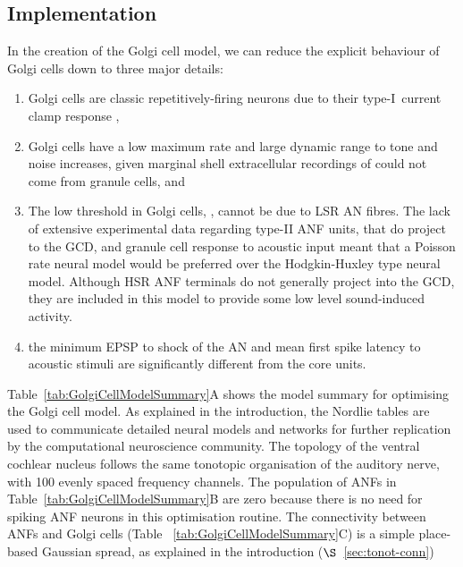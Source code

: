 \subsection{Implementation}\label{sec:Golgi:implementation}

In the creation of the Golgi cell model, we can reduce the explicit behaviour of Golgi cells down to three major details:
 \begin{enumerate}
 \item Golgi cells are classic repetitively-firing neurons due to
   their type-I~current clamp response
   \citep{FerragamoGoldingEtAl:1998},
 \item Golgi cells have a low maximum rate and large dynamic range to
   tone and noise increases, given marginal shell extracellular
   recordings of \citet{GhoshalKim:1997} could not come from granule
   cells, and
 \item The low threshold in Golgi cells, \citet{GhoshalKim:1997},
   cannot be due to LSR AN fibres. The lack of extensive experimental
   data regarding type-II ANF units, that do project to the GCD, and
   granule cell response to acoustic input meant that a Poisson rate
   neural model would be preferred over the Hodgkin-Huxley type neural
   model.  Although HSR ANF terminals do not generally project into
   the GCD, they are included in this model to provide some low level
   sound-induced activity.
 \item the minimum EPSP to shock of the AN
   \citep{FerragamoGoldingEtAl:1998} and mean first spike latency to
   acoustic stimuli \citep{GhoshalKim:1997} are significantly
   different from the core \VCN units.
 \end{enumerate}

\smallskip{}

Table~\ref{tab:GolgiCellModelSummary}A shows the model summary for
optimising the Golgi cell model. As explained in the introduction, the
Nordlie tables are used to communicate detailed neural models and
networks for further replication by the computational neuroscience
community. The topology of the ventral cochlear nucleus follows the
same tonotopic organisation of the auditory nerve, with 100 evenly
spaced frequency channels. The population of ANFs in
Table~\ref{tab:GolgiCellModelSummary}B are zero because there is no
need for spiking ANF neurons in this optimisation routine.  The
connectivity between ANFs and Golgi cells (Table
~\ref{tab:GolgiCellModelSummary}C) is a simple place-based Gaussian
spread, as explained in the introduction ($\S$~\ref{sec:tonot-conn})

